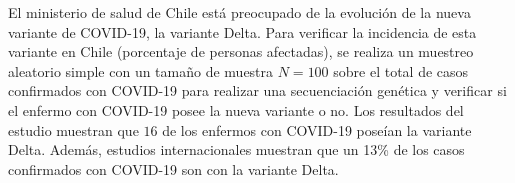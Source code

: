 
\addpoints
\question[20] El ministerio de salud de Chile está preocupado de la evolución de la nueva variante de COVID-19, la variante Delta. Para verificar la incidencia de esta variante en Chile (porcentaje de personas afectadas), se realiza un muestreo aleatorio simple con un tamaño de muestra $N=100$ sobre el total de casos confirmados con COVID-19 para realizar una secuenciación genética y verificar si el enfermo con COVID-19 posee la nueva variante o no. Los resultados del estudio muestran que $16$ de los enfermos con COVID-19 poseían la variante Delta.  
Además, estudios internacionales muestran que un 13\% de los casos confirmados con COVID-19 son con la variante Delta.
 

\noaddpoints
{}

